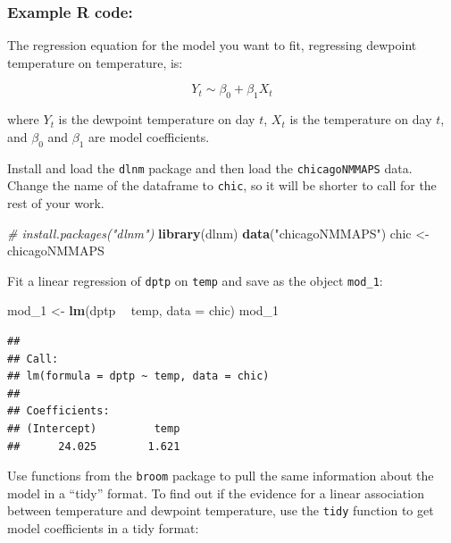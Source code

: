 \documentclass[]{book}
\makeatletter
\newenvironment{Shaded}{\begin{snugshade}}{\end{snugshade}}
\newcommand{\KeywordTok}[1]{\textcolor[rgb]{0.13,0.29,0.53}{\textbf{#1}}}
\newcommand{\DataTypeTok}[1]{\textcolor[rgb]{0.13,0.29,0.53}{#1}}
\newcommand{\DecValTok}[1]{\textcolor[rgb]{0.00,0.00,0.81}{#1}}
\newcommand{\StringTok}[1]{\textcolor[rgb]{0.31,0.60,0.02}{#1}}
\newcommand{\CommentTok}[1]{\textcolor[rgb]{0.56,0.35,0.01}{\textit{#1}}}
\newcommand{\OperatorTok}[1]{\textcolor[rgb]{0.81,0.36,0.00}{\textbf{#1}}}
\newcommand{\NormalTok}[1]{#1}
\newenvironment{kframe}{%
\medskip{}
\setlength{\fboxsep}{.8em}
 \def\at@end@of@kframe{}%
 \ifinner\ifhmode%
  \def\at@end@of@kframe{\end{minipage}}%
  \begin{minipage}{\columnwidth}%
 \fi\fi%
 \def\FrameCommand##1{\hskip\@totalleftmargin \hskip-\fboxsep
 \colorbox{shadecolor}{##1}\hskip-\fboxsep
     \hskip-\linewidth \hskip-\@totalleftmargin \hskip\columnwidth}%
 \MakeFramed {\advance\hsize-\width
   \@totalleftmargin\z@ \linewidth\hsize
   \@setminipage}}%
 {\par\unskip\endMakeFramed%
 \at@end@of@kframe}
\renewenvironment{Shaded}{\begin{kframe}}{\end{kframe}}
\theoremstyle{definition}
\theoremstyle{definition}
\theoremstyle{definition}
\theoremstyle{remark}
\makeatother
\begin{document}
\subsubsection{Example R code:}\label{example-r-code-12}

The regression equation for the model you want to fit, regressing
dewpoint temperature on temperature, is:

\[
Y_t \sim \beta_0 + \beta_1 X_t
\]

where \(Y_t\) is the dewpoint temperature on day \(t\), \(X_t\) is the
temperature on day \(t\), and \(\beta_0\) and \(\beta_1\) are model
coefficients.

Install and load the \texttt{dlnm} package and then load the
\texttt{chicagoNMMAPS} data. Change the name of the dataframe to
\texttt{chic}, so it will be shorter to call for the rest of your work.

\begin{Shaded}
\begin{Highlighting}[]
\CommentTok{# install.packages("dlnm")}
\KeywordTok{library}\NormalTok{(dlnm)}
\KeywordTok{data}\NormalTok{(}\StringTok{"chicagoNMMAPS"}\NormalTok{)}
\NormalTok{chic <-}\StringTok{ }\NormalTok{chicagoNMMAPS}
\end{Highlighting}
\end{Shaded}

Fit a linear regression of \texttt{dptp} on \texttt{temp} and save as
the object \texttt{mod\_1}:

\begin{Shaded}
\begin{Highlighting}[]
\NormalTok{mod_}\DecValTok{1}\NormalTok{ <-}\StringTok{ }\KeywordTok{lm}\NormalTok{(dptp }\OperatorTok{~}\StringTok{ }\NormalTok{temp, }\DataTypeTok{data =}\NormalTok{ chic)}
\NormalTok{mod_}\DecValTok{1}
\end{Highlighting}
\end{Shaded}

\begin{verbatim}
## 
## Call:
## lm(formula = dptp ~ temp, data = chic)
## 
## Coefficients:
## (Intercept)         temp  
##      24.025        1.621
\end{verbatim}

Use functions from the \texttt{broom} package to pull the same
information about the model in a ``tidy'' format. To find out if the
evidence for a linear association between temperature and dewpoint
temperature, use the \texttt{tidy} function to get model coefficients in
a tidy format:
\end{document}
